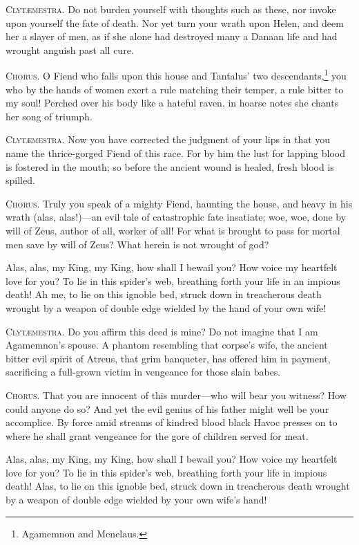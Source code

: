 \documentclass[12pt]{article}
\begin{document}
\textsc{Clyt{\ae}mestra.} Do not burden yourself with thoughts such as these, nor invoke upon yourself the fate of death. Nor yet turn your wrath upon Helen, and deem her a slayer of men, as if she alone had destroyed many a Danaan life and had wrought anguish past all cure.

\textsc{Chorus.} O Fiend who falls upon this house and Tantalus' two descendants,\footnote{Agamemnon and Menelaus.} you who by the hands of women exert a rule matching their temper, a rule bitter to my soul! Perched over his body like a hateful raven, in hoarse notes she chants her song of triumph.

\textsc{Clyt{\ae}mestra.} Now you have corrected the judgment of your lips in that you name the thrice-gorged Fiend of this race. For by him the lust for lapping blood is fostered in the mouth; so before the ancient wound is healed, fresh blood is spilled.

\textsc{Chorus.} Truly you speak of a mighty Fiend, haunting the house, and heavy in his wrath (alas, alas!)---an evil tale of catastrophic fate insatiate; woe, woe, done by will of Zeus, author of all, worker of all! For what is brought to pass for mortal men save by will of Zeus? What herein is not wrought of god?

Alas, alas, my King, my King, how shall I bewail you? How voice my heartfelt love for you? To lie in this spider's web, breathing forth your life in an impious death! Ah me, to lie on this ignoble bed, struck down in treacherous death wrought by a weapon of double edge wielded by the hand of your own wife!

\textsc{Clyt{\ae}mestra.} Do you affirm this deed is mine? Do not imagine that I am Agamemnon's spouse. A phantom resembling that corpse's wife, the ancient bitter evil spirit of Atreus, that grim banqueter, has offered him in payment, sacrificing a full-grown victim in vengeance for those slain babes.

\textsc{Chorus.} That you are innocent of this murder---who will bear you witness? How could anyone do so? And yet the evil genius of his father might well be your accomplice. By force amid streams of kindred blood black Havoc presses on to where he shall grant vengeance for the gore of children served for meat.

Alas, alas, my King, my King, how shall I bewail you? How voice my heartfelt love for you? To lie in this spider's web, breathing forth your life in impious death! Alas, to lie on this ignoble bed, struck down in treacherous death wrought by a weapon of double edge wielded by your own wife's hand!
\end{document}
